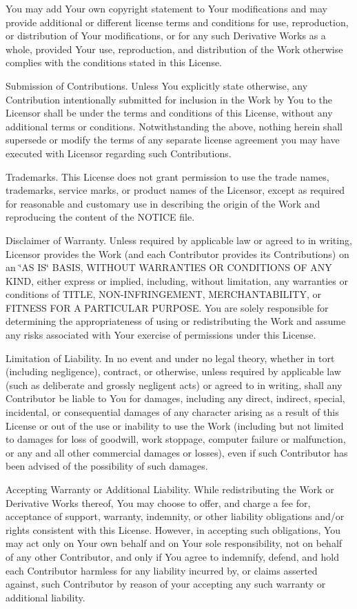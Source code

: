 \begin{DoxyEnumerate}
You may add Your own copyright statement to Your modifications and may provide additional or different license terms and conditions for use, reproduction, or distribution of Your modifications, or for any such Derivative Works as a whole, provided Your use, reproduction, and distribution of the Work otherwise complies with the conditions stated in this License.
\item Submission of Contributions. Unless You explicitly state otherwise, any Contribution intentionally submitted for inclusion in the Work by You to the Licensor shall be under the terms and conditions of this License, without any additional terms or conditions. Notwithstanding the above, nothing herein shall supersede or modify the terms of any separate license agreement you may have executed with Licensor regarding such Contributions.
\item Trademarks. This License does not grant permission to use the trade names, trademarks, service marks, or product names of the Licensor, except as required for reasonable and customary use in describing the origin of the Work and reproducing the content of the NOTICE file.
\item Disclaimer of Warranty. Unless required by applicable law or agreed to in writing, Licensor provides the Work (and each Contributor provides its Contributions) on an \char`\"{}\+AS IS\char`\"{} BASIS, WITHOUT WARRANTIES OR CONDITIONS OF ANY KIND, either express or implied, including, without limitation, any warranties or conditions of TITLE, NON-\/\+INFRINGEMENT, MERCHANTABILITY, or FITNESS FOR A PARTICULAR PURPOSE. You are solely responsible for determining the appropriateness of using or redistributing the Work and assume any risks associated with Your exercise of permissions under this License.
\item Limitation of Liability. In no event and under no legal theory, whether in tort (including negligence), contract, or otherwise, unless required by applicable law (such as deliberate and grossly negligent acts) or agreed to in writing, shall any Contributor be liable to You for damages, including any direct, indirect, special, incidental, or consequential damages of any character arising as a result of this License or out of the use or inability to use the Work (including but not limited to damages for loss of goodwill, work stoppage, computer failure or malfunction, or any and all other commercial damages or losses), even if such Contributor has been advised of the possibility of such damages.
\item Accepting Warranty or Additional Liability. While redistributing the Work or Derivative Works thereof, You may choose to offer, and charge a fee for, acceptance of support, warranty, indemnity, or other liability obligations and/or rights consistent with this License. However, in accepting such obligations, You may act only on Your own behalf and on Your sole responsibility, not on behalf of any other Contributor, and only if You agree to indemnify, defend, and hold each Contributor harmless for any liability incurred by, or claims asserted against, such Contributor by reason of your accepting any such warranty or additional liability.
\end{DoxyEnumerate}

